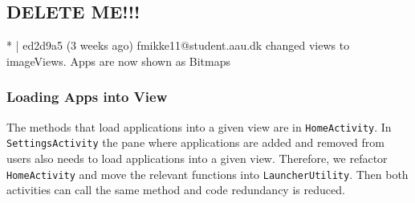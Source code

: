 

\subsection{DELETE ME!!!}

{\color{red}* | ed2d9a5 (3 weeks ago) fmikke11@student.aau.dk changed views to imageViews. Apps are now shown as Bitmaps}


\subsubsection{Loading Apps into View}\label{sec:sprint:designlauncher}
The methods that load applications into a given view are in \lstinline!HomeActivity!.
In \lstinline!SettingsActivity! the pane where applications are added and removed from users also needs to load applications into a given view.
Therefore, we refactor \lstinline!HomeActivity! and move the relevant functions into \lstinline!LauncherUtility!.
Then both activities can call the same method and code redundancy is reduced. 